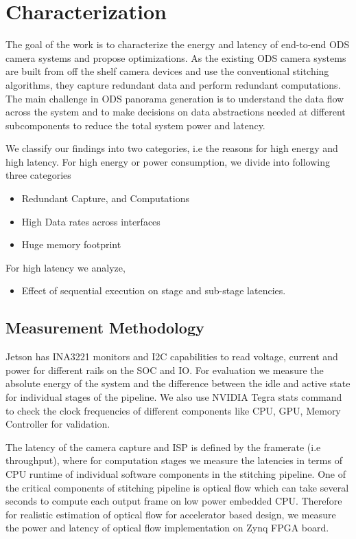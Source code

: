 \chapter{Characterization}
\label{chap:Char}
The goal of the work is to characterize the energy and latency of end-to-end ODS camera  systems and propose optimizations. As the existing ODS camera systems are built from off the shelf camera devices and use the conventional stitching algorithms, they capture redundant data and perform redundant computations. The main challenge in ODS panorama generation is to understand the data flow across the system and to make decisions on data abstractions needed at different subcomponents to reduce the total system power and latency.

We classify our findings into two categories, i.e the reasons for high energy and high latency.
For high energy or power consumption, we divide into following three categories
\begin{itemize}
	\item Redundant Capture, and Computations
	\item High Data rates across interfaces
	\item Huge memory footprint
\end{itemize}
For high latency we analyze,
\begin{itemize}
	\item Effect of sequential execution on stage and sub-stage latencies.
\end{itemize}

\section{Measurement Methodology} %
Jetson has INA3221 monitors and I2C capabilities to read voltage, current and power for different rails on the SOC and IO. For evaluation we measure the absolute energy of the system and the difference between the idle and active state for individual stages of the pipeline. We also use NVIDIA Tegra stats command to check the clock frequencies of different components like CPU, GPU, Memory Controller for validation. 

The latency of the camera capture and ISP is defined by the framerate (i.e throughput), where for computation stages we measure the latencies in terms of CPU runtime of individual software components in the stitching pipeline. One of the critical components of stitching pipeline is optical flow which can take several seconds to compute each output frame on low power embedded CPU. Therefore for realistic estimation of optical flow for accelerator based design, we measure the power and latency of optical flow implementation on Zynq FPGA board. 

